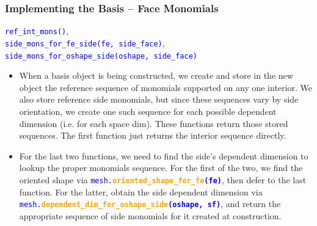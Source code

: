 \documentclass[compress]{beamer}
\begin{document}
\begin{frame}
  \frametitle{Implementing the Basis -- Face Monomials}
      \texttt{\textcolor{blue}{ref\_int\_mons()}},\\ 
      \texttt{\textcolor{blue}{side\_mons\_for\_fe\_side(fe, side\_face)}}, \\
      \texttt{\textcolor{blue}{side\_mons\_for\_oshape\_side(oshape, side\_face)}}\\
      \small
      \begin{itemize}[<+->]
      \item
      When a basis object is being constructed, we create and store in the new object the reference sequence of
      monomials supported on any one interior. We also store reference side monomials, but since these sequences
      vary by side orientation, we create one such sequence for each possible dependent dimension (i.e. for each space dim).
      These functions return those stored sequences. The first function just returns the interior sequence directly.
      \item 
      For the last two functions, we need to find the side's dependent dimension to lookup the proper monomials sequence.
      For the first of the two, we find the oriented shape via 
        {\scriptsize \texttt{\textcolor{blue}{mesh.\textbf{\textcolor{orange}{oriented\_shape\_for\_fe}(fe)}}}}, 
      then defer to the last function.  For the latter, obtain the side dependent dimension via
      {\scriptsize \texttt{\textcolor{blue}{mesh.\textbf{\textcolor{orange}{dependent\_dim\_for\_oshape\_side}(oshape, sf)}}}},
      and return the appropriate sequence of side monomials for it created at construction.
    \end{itemize}
\end{frame}
\end{document}
